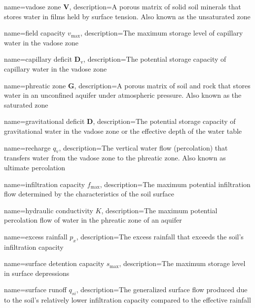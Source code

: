 {
    name=vadose zone $\textbf{V}$,
    description={A porous matrix of solid soil minerals that stores water in films held by surface tension. Also known as the unsaturated zone}
}

{
    name=field capacity $v_{\text{max}}$,
    description={The maximum storage level of capillary water in the vadose zone}
}

{
    name=capillary deficit $\textbf{D}_\text{v}$,
    description={The potential storage capacity of capillary water in the vadose zone}
}

{
    name=phreatic zone $\textbf{G}$,
    description={A porous matrix of soil and rock that stores water in an unconfined aquifer under atmospheric pressure. Also known as the saturated zone}
}

{
    name=gravitational deficit $\textbf{D}$,
    description={The potential storage capacity of gravitational water in the vadose zone or the effective depth of the water table}
}

{
    name=recharge $q_{\text{v}}$,
    description={The vertical water flow (percolation) that transfers water from the vadose zone to the phreatic zone. Also known as ultimate percolation}
}

{
    name=infiltration capacity $f_{\text{max}}$,
    description={The maximum potential infiltration flow determined by the characteristics of the soil surface}
}

{
    name=hydraulic conductivity $K$,
    description={The maximum potential percolation flow of water in the phreatic zone of an aquifer}
}

{
    name=excess rainfall $p_{x}$,
    description={The excess rainfall that exceeds the soil's infiltration capacity}
}

{
    name=surface detention capacity $s_{\text{max}}$,
    description={The maximum storage level in surface depressions}
}

{
    name=surface runoff $q_{si}$,
    description={The generalized surface flow produced due to the soil's relatively lower infiltration capacity compared to the effective rainfall}
}

